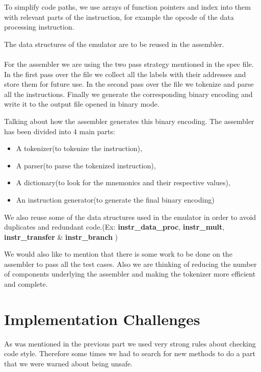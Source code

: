 \documentclass[11pt]{article}
\begin{document}
To simplify code paths, we use arrays of function pointers and index into them
with relevant parts of the instruction, for example the opcode of the data
processing instruction.

The data structures of the emulator are to be reused in the assembler.
\\ \\
For the assembler we are using the two pass strategy mentioned in the spec
file. In the first pass over the file we collect all the labels with their
addresses and store them for future use. In the second pass over the file
we tokenize and parse all the instructions. Finally we generate the
corresponding binary encoding and write it to the output file opened in
binary mode.

Talking about how the assembler generates this binary encoding. The assembler
has been divided into 4 main parts:
\begin{itemize}
\item A tokenizer(to tokenize the instruction),
\item A parser(to parse the tokenized instruction),
\item A dictionary(to look for the mnemonics and their respective values),
\item An instruction generator(to generate the final binary encoding)
\end{itemize}

We also reuse some of the data structures used in the emulator in order to
avoid duplicates and redundant code.(Ex:
\textbf{instr\_data\_proc}, \textbf{instr\_mult}, \textbf{instr\_transfer} \& \textbf{instr\_branch}
)

We would also like to mention that there is some work to be done on the
assembler to pass all the test cases. Also we are thinking of reducing the
number of components underlying the assembler and making the tokenizer more
efficient and complete.

\section{Implementation Challenges}

As was mentioned in the previous part we used very strong rules about checking
code style. Therefore some times we had to search for new methods to do a part
that we were warned about being unsafe.
\end{document}
